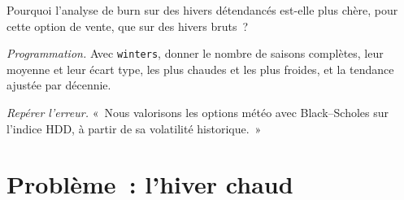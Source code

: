 \begin{exercise}[$\star\star$]\label{exo:m3:freight-weather-and-other-corners:6}
Pourquoi l'analyse de burn sur des hivers détendancés est-elle plus chère, pour cette option de vente, que sur des hivers bruts~?
\end{exercise}

\begin{exercise}[$\star\star\star$]\label{exo:m3:freight-weather-and-other-corners:7}
\emph{Programmation.} Avec \texttt{winters}, donner le nombre de saisons complètes, leur moyenne et leur écart type,
les plus chaudes et les plus froides, et la tendance ajustée par décennie.
\end{exercise}

\begin{exercise}[$\star\star\star$]\label{exo:m3:freight-weather-and-other-corners:8}
\emph{Repérer l'erreur.} «~Nous valorisons les options météo avec Black--Scholes sur l'indice HDD, à partir de sa volatilité
historique.~»
\end{exercise}

\section{Problème~: l'hiver chaud}

